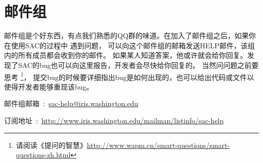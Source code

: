 \section{邮件组}
邮件组是个好东西，有点我们熟悉的QQ群的味道。在加入了邮件组之后，如果你在使用SAC的过程中
遇到问题，
可以向这个邮件组的邮箱发送HELP邮件，该组内的所有成员都会收到你的邮件。
如果某人知道答案，他或许就会给你回复。发现了SAC的bug也可以向这里报告，开发者会尽快给你回复的。
当然问问题之前要思考
\footnote{请阅读《提问的智慧》\url{http://www.wapm.cn/smart-questions/smart-questions-zh.html}}，
提交bug的时候要详细指出bug是如何出现的，也可以给出代码或文件以使得开发者能够重现该bug。

邮件组邮箱~:~\url{sac-help@iris.washington.edu}

订阅地址~:~\small{\url{http://www.iris.washington.edu/mailman/listinfo/sac-help}}
